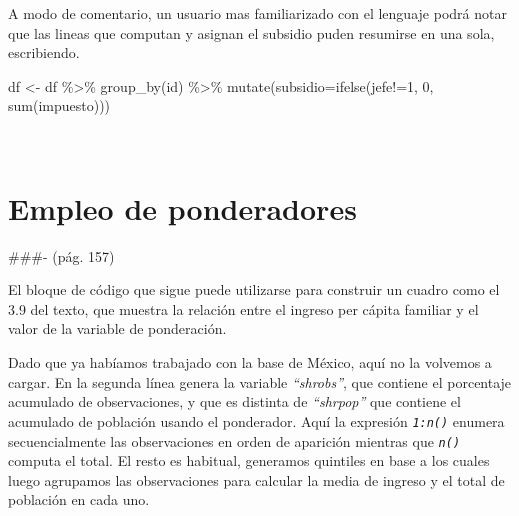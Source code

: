 \documentclass[
]{book}
\newenvironment{Shaded}{\begin{snugshade}}{\end{snugshade}}
\newcommand{\AttributeTok}[1]{\textcolor[rgb]{0.77,0.63,0.00}{#1}}
\newcommand{\DecValTok}[1]{\textcolor[rgb]{0.00,0.00,0.81}{#1}}
\newcommand{\FunctionTok}[1]{\textcolor[rgb]{0.00,0.00,0.00}{#1}}
\newcommand{\NormalTok}[1]{#1}
\newcommand{\OtherTok}[1]{\textcolor[rgb]{0.56,0.35,0.01}{#1}}
\newcommand{\SpecialCharTok}[1]{\textcolor[rgb]{0.00,0.00,0.00}{#1}}
\begin{document}
A modo de comentario, un usuario mas familiarizado con el lenguaje podrá notar que las lineas que computan y asignan el subsidio puden resumirse en una sola, escribiendo.

\begin{Shaded}
\begin{Highlighting}[]
\NormalTok{df }\OtherTok{\textless{}{-}}\NormalTok{ df }\SpecialCharTok{\%\textgreater{}\%} \FunctionTok{group\_by}\NormalTok{(id) }\SpecialCharTok{\%\textgreater{}\%} \FunctionTok{mutate}\NormalTok{(}\AttributeTok{subsidio=}\FunctionTok{ifelse}\NormalTok{(jefe}\SpecialCharTok{!=}\DecValTok{1}\NormalTok{, }\DecValTok{0}\NormalTok{, }\FunctionTok{sum}\NormalTok{(impuesto)))}
\end{Highlighting}
\end{Shaded}

~

\hypertarget{cap-3.6}{%
\section{Empleo de ponderadores}\label{cap-3.6}}

\#\#\#- (pág. 157)

El bloque de código que sigue puede utilizarse para construir un cuadro como el 3.9 del texto, que muestra la relación entre el ingreso per cápita familiar y el valor de la variable de ponderación.

Dado que ya habíamos trabajado con la base de México, aquí no la volvemos a cargar. En la segunda línea genera la variable \emph{``shrobs''}, que contiene el porcentaje acumulado de observaciones, y que es distinta de \emph{``shrpop''} que contiene el acumulado de población usando el ponderador. Aquí la expresión \emph{\texttt{1:n()}} enumera secuencialmente las observaciones en orden de aparición mientras que \emph{\texttt{n()}} computa el total. El resto es habitual, generamos quintiles en base a los cuales luego agrupamos las observaciones para calcular la media de ingreso y el total de población en cada uno.
\end{document}
